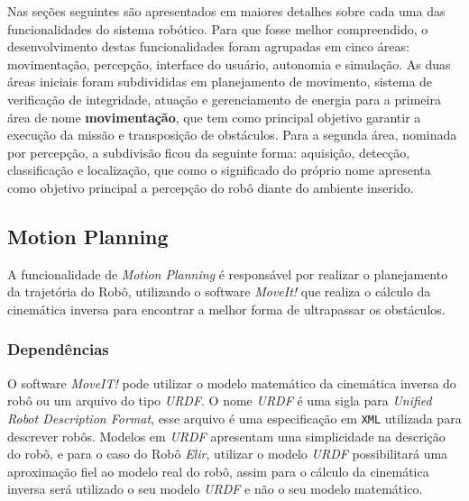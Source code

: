 Nas seções seguintes são apresentados em maiores detalhes sobre cada uma das funcionalidades do sistema robótico. Para que fosse melhor compreendido, o desenvolvimento destas funcionalidades foram agrupadas em cinco áreas: movimentação, percepção, interface do usuário, autonomia e simulação. As duas áreas iniciais foram subdivididas em planejamento de movimento, sistema de verificação de integridade, atuação e gerenciamento de energia para a primeira área de nome \textbf{movimentação}, que tem como principal objetivo garantir a execução da missão e transposição de obstáculos. Para a segunda área, nominada por percepção, a subdivisão ficou da seguinte forma: aquisição, detecção, classificação e localização, que como o significado do próprio nome apresenta como objetivo principal a percepção do robô diante do ambiente inserido.




\subsection{Motion Planning}
\label{ssec:motion}
A funcionalidade de \textit{Motion Planning} é responsável por realizar o planejamento da trajetória do Robô, utilizando o software \textit{MoveIt!} que realiza o cálculo da cinemática inversa para encontrar a melhor forma de ultrapassar os obstáculos.
\subsubsection{Dependências}
O software \textit{MoveIT!} pode utilizar o modelo matemático da cinemática inversa do robô ou um arquivo do tipo \textit{URDF}.
O nome \textit{URDF} é uma sigla para \textit{Unified Robot Description Format}, esse arquivo é uma especificação em \verb|XML| utilizada para descrever robôs. Modelos em \textit{URDF} apresentam uma simplicidade na descrição do robô, e para o caso do Robô \textit{Elir}, utilizar o modelo \textit{URDF} possibilitará uma aproximação fiel ao modelo real do robô, assim para o cálculo da cinemática inversa será utilizado o seu modelo \textit{URDF} e não o seu modelo matemático.


